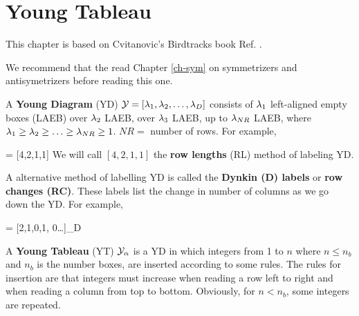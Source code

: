 \chapter{Young Tableau}
\label{ch-young-tableau}

This chapter is based on Cvitanovic's Birdtracks book Ref. \cite{birdtracks-book}.

We recommend that the read Chapter \ref{ch-sym}
on symmetrizers and antisymetrizers
before reading this one.

A {\bf Young Diagram} (YD) ${\cal Y}=[\lambda_1, \lambda_2, \ldots, \lambda_D]$ 
consists of $\lambda_1$ left-aligned empty boxes (LAEB)
over $\lambda_2$ LAEB, over 
$\lambda_3$ LAEB, up to
$\lambda_{NR}$ LAEB,
where $\lambda_1\geq \lambda_2\geq \ldots\geq \lambda_{NR}\geq 1$.
$NR=$ number of rows.
For example,

\beq
{} =
[4,2,1,1]
\eeq
We will call $[4, 2,1,1]$ the
{\bf row lengths} (RL) method 
of labeling YD.

A alternative method of labelling YD is called the {\bf Dynkin (D) labels} 
or {\bf row changes (RC)}.
These labels list the change in number of columns as 
we go down the YD.
For example,

\beq
{}
=
[2,1,0,1, 0\ldots]_{D}
\eeq



A {\bf Young Tableau} (YT)
${\cal Y}_\alpha$ is a YD in which integers from 1 to $n$ where $n\leq n_b$ and $n_b$ is the number boxes, are inserted according to some rules. The rules for insertion are that integers must increase when reading a row  left to right and
when reading a column from top to bottom. Obviously, for $n<n_b$, some integers are repeated.

